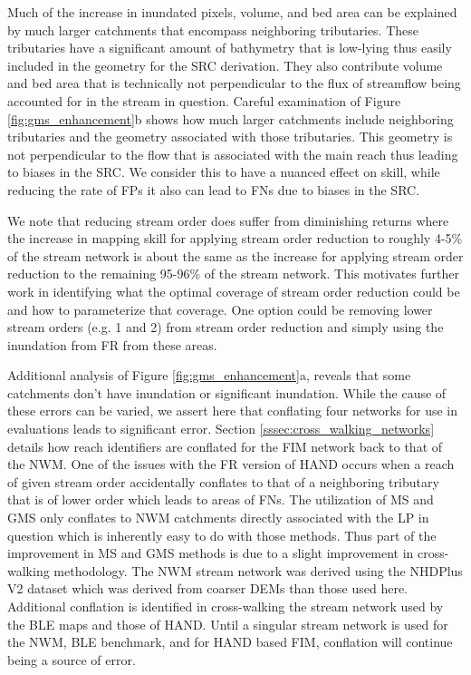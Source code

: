 \documentclass[draft]{dependencies/agujournal2019}
\begin{document}
Much of the increase in inundated pixels, volume, and bed area can be explained by much larger catchments that encompass neighboring tributaries.
These tributaries have a significant amount of bathymetry that is low-lying thus easily included in the geometry for the SRC derivation. 
They also contribute volume and bed area that is technically not perpendicular to the flux of streamflow being accounted for in the stream in question. 
Careful examination of Figure \ref{fig:gms_enhancement}b shows how much larger catchments include neighboring tributaries and the geometry associated with those tributaries. 
This geometry is not perpendicular to the flow that is associated with the main reach thus leading to biases in the SRC.
We consider this to have a nuanced effect on skill, while reducing the rate of FPs it also can lead to FNs due to biases in the SRC.

We note that reducing stream order does suffer from diminishing returns where the increase in mapping skill for applying stream order reduction to roughly 4-5\% of the stream network is about the same as the increase for applying stream order reduction to the remaining 95-96\% of the stream network.
This motivates further work in identifying what the optimal coverage of stream order reduction could be and how to parameterize that coverage. 
One option could be removing lower stream orders (e.g. 1 and 2) from stream order reduction and simply using the inundation from FR from these areas.

Additional analysis of Figure \ref{fig:gms_enhancement}a, reveals that some catchments don't have inundation or significant inundation.
While the cause of these errors can be varied, we assert here that conflating four networks for use in evaluations leads to significant error.
Section \ref{sssec:cross_walking_networks} details how reach identifiers are conflated for the FIM network back to that of the NWM. 
One of the issues with the FR version of HAND occurs when a reach of given stream order accidentally conflates to that of a neighboring tributary that is of lower order which leads to areas of FNs.
The utilization of MS and GMS only conflates to NWM catchments directly associated with the LP in question which is inherently easy to do with those methods. 
Thus part of the improvement in MS and GMS methods is due to a slight improvement in cross-walking methodology.
The NWM stream network was derived using the NHDPlus V2 dataset which was derived from coarser DEMs than those used here. 
Additional conflation is identified in cross-walking the stream network used by the BLE maps and those of HAND.
Until a singular stream network is used for the NWM, BLE benchmark, and for HAND based FIM, conflation will continue being a source of error.
\end{document}
